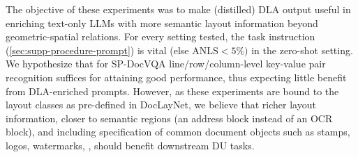 \documentclass[runningheads]{llncs}
\begin{document}
The objective of these experiments was to make (distilled) DLA output useful in enriching text-only LLMs with more semantic layout information beyond geometric-spatial relations.
For every setting tested, the task instruction (\cref{sec:supp-procedure-prompt}) is vital (else $\mathrm{ANLS} < 5\%)$ in the zero-shot setting.
We hypothesize that for SP-DocVQA line/row/column-level key-value pair recognition suffices for attaining good performance, thus expecting little benefit from DLA-enriched prompts.
However, as these experiments are bound to the layout classes as pre-defined in DocLayNet, we believe that richer layout information, closer to semantic regions (\eg an address block instead of an OCR block), and including specification of common document objects such as stamps, logos, watermarks, \etc, should benefit downstream DU tasks.


\begin{table}[h]
    \centering
    \caption{Performance per KD method over metrics averaged over architectures on RVL-CDIP dataset (In-Domain) and RVL-CDIP-N dataset (Out-Of-Distribution).}
    \label{tab:covarvsid_perKDmethod}
\end{table}
\end{document}
